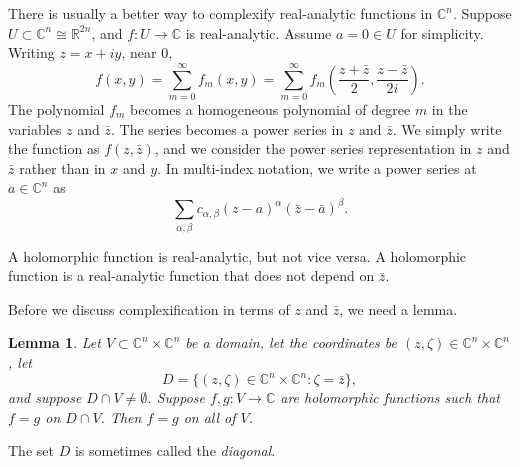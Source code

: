 \documentclass[12pt,openany]{book}
\newcommand{\C}{{\mathbb{C}}}
\newcommand{\R}{{\mathbb{R}}}
\newcommand{\myindex}[1]{#1\index{#1}}
\theoremstyle{plain}
\newtheorem{lemma}[thm]{Lemma}
\theoremstyle{remark}
\theoremstyle{definition}
\theoremstyle{exercise}
\theoremstyle{example}
\begin{document}
There is usually a better way to complexify
real-analytic functions in $\C^n$.
Suppose $U \subset \C^n \cong \R^{2n}$, and $f \colon U \to
\C$ is real-analytic.  Assume $a=0 \in U$ for simplicity.
Writing $z = x+iy$, near $0$,
\begin{equation*}
f(x,y)
=
\sum_{m=0}^\infty
f_m(x,y)
=
\sum_{m=0}^\infty
f_m\left(
\frac{z+\bar{z}}{2},
\frac{z-\bar{z}}{2i}\right) .
\end{equation*}
The polynomial $f_m$ becomes a homogeneous polynomial of degree $m$
in the variables $z$ and $\bar{z}$.  The
series becomes a power series in $z$ and $\bar{z}$.
We simply write the function as $f(z,\bar{z})$, and we consider the
power series representation in $z$ and $\bar{z}$ rather than
in $x$ and $y$.
In multi-index notation, we write a power series at $a \in \C^n$ as
\begin{equation*}
\sum_{\alpha,\beta} c_{\alpha,\beta} {(z-a)}^\alpha
{(\bar{z}-\bar{a})}^\beta .
\end{equation*}

A holomorphic function
is real-analytic, but not vice versa.  A holomorphic function
is a real-analytic function that does not depend on $\bar{z}$.

Before we discuss complexification in terms of $z$ and $\bar{z}$, we need
a lemma.

\begin{lemma}
Let $V \subset \C^n \times \C^n$ be a domain, let the coordinates be $(z,\zeta) \in \C^n \times
\C^n$, let
\begin{equation*}
D = \bigl\{ (z,\zeta) \in \C^n \times \C^n : \zeta = \bar{z} \bigr\},
\end{equation*}
and suppose $D \cap V \neq \emptyset$.
Suppose $f,g \colon V \to \C$ are holomorphic functions such that
$f=g$ on $D \cap V$.  Then $f=g$ on all of $V$.
\end{lemma}

The set $D$ is sometimes called the \emph{\myindex{diagonal}}.
\end{document}
